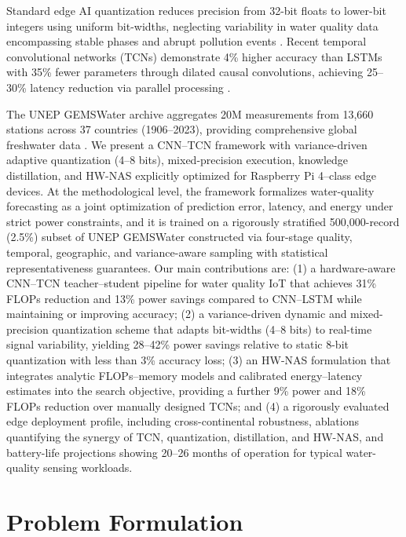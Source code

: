\documentclass[12pt,a4paper]{article}
\begin{document}
Standard edge AI quantization reduces precision from 32-bit floats to lower-bit integers using uniform bit-widths, neglecting variability in water quality data encompassing stable phases and abrupt pollution events \citep{gholami2021quant, liu2025lowbit}. Recent temporal convolutional networks (TCNs) demonstrate 4\% higher accuracy than LSTMs with 35\% fewer parameters through dilated causal convolutions, achieving 25--30\% latency reduction via parallel processing \citep{lin2021tcan, luo2024moderntcn, chen2020prob}.

The UNEP GEMSWater archive aggregates 20M measurements from 13,660 stations across 37 countries (1906--2023), providing comprehensive global freshwater data \citep{unep2024gemswater}. We present a CNN--TCN framework with variance-driven adaptive quantization (4--8 bits), mixed-precision execution, knowledge distillation, and HW-NAS explicitly optimized for Raspberry Pi 4--class edge devices. At the methodological level, the framework formalizes water-quality forecasting as a joint optimization of prediction error, latency, and energy under strict power constraints, and it is trained on a rigorously stratified 500{,}000-record (2.5\%) subset of UNEP GEMSWater constructed via four-stage quality, temporal, geographic, and variance-aware sampling with statistical representativeness guarantees. Our main contributions are: (1) a hardware-aware CNN--TCN teacher--student pipeline for water quality IoT that achieves 31\% FLOPs reduction and 13\% power savings compared to CNN--LSTM while maintaining or improving accuracy; (2) a variance-driven dynamic and mixed-precision quantization scheme that adapts bit-widths (4--8 bits) to real-time signal variability, yielding 28--42\% power savings relative to static 8-bit quantization with less than 3\% accuracy loss; (3) an HW-NAS formulation that integrates analytic FLOPs--memory models and calibrated energy--latency estimates into the search objective, providing a further 9\% power and 18\% FLOPs reduction over manually designed TCNs; and (4) a rigorously evaluated edge deployment profile, including cross-continental robustness, ablations quantifying the synergy of TCN, quantization, distillation, and HW-NAS, and battery-life projections showing 20--26 months of operation for typical water-quality sensing workloads.

\section{Problem Formulation}
\label{sec:problem}
\end{document}
